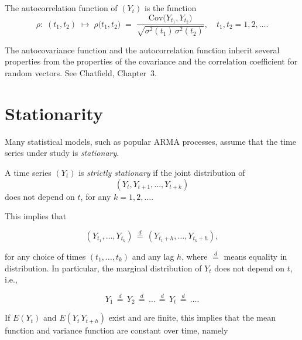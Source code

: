 \documentclass[dvipsnames,12pt]{book}
\begin{document}
            \begin{definition}
                The autocorrelation function of $(Y_t)$ is the function 
                \[
                \rho:\; (t_1, t_2) \;\mapsto\;  \rho\bigl(t_1, t_2\bigr)  \;=\; \frac{\mathrm{Cov}\bigl(Y_{t_1}, Y_{t_2}\bigr)}{\sqrt{\sigma^2(t_1)\,\sigma^2(t_2)}}, \quad t_1, t_2 = 1, 2, \ldots.
                \]
            \end{definition}

            The autocovariance function and the autocorrelation function inherit several  properties from the properties of the covariance and the correlation coefficient  for random vectors. See Chatfield, Chapter~3.

\newpage
        \section{Stationarity}

            Many statistical models, such as popular ARMA processes, assume that the time series under study is \textit{stationary}.

            \begin{definition}\label{def:strict_stat}
            A time series $(Y_t)$ is \emph{strictly stationary} if the joint distribution of 
            \[
            (Y_t, Y_{t+1}, \ldots, Y_{t+k})
            \]
            does not depend on $t$, for any $k = 1, 2, \ldots$. 
            \end{definition}
            
            This implies that
            
            \[
            (Y_{t_1}, \ldots, Y_{t_k}) \,\overset{d}{=} \,(Y_{t_1 + h}, \ldots, Y_{t_k + h}),
            \]
            
            \noindent for any choice of times $(t_1, \ldots, t_k)$ and any lag $h$, where $\overset{d}{=}$ means equality in distribution. In particular, the marginal distribution of $Y_t$ does not depend on $t$, i.e.,
            
            \[
            Y_1 \,\overset{d}{=} \,Y_2 \,\overset{d}{=} \,\dots \,\overset{d}{=} \,Y_t \,\overset{d}{=} \,\dots.
            \]
            
            \noindent If $E(Y_t)$ and $E(Y_t\,Y_{t+h})$ exist and are finite, this implies that the mean function and variance function are constant over time, namely
            
\end{document}
